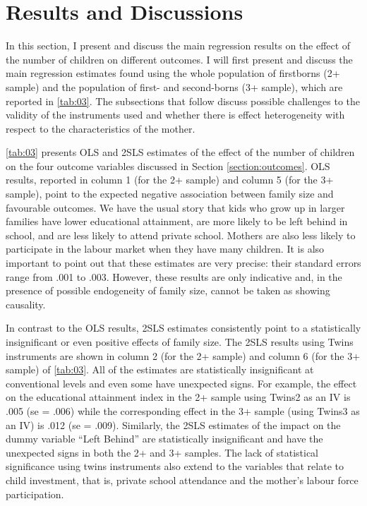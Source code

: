 
\section{Results and Discussions}
\label{section:results}

In this section, I present and discuss the main regression results on the effect of the number of children on different outcomes. I will first present and discuss the main regression estimates found using the whole population of firstborns (2+ sample) and the population of first- and second-borns (3+ sample), which are reported in \autoref{tab:03}. The subsections that follow discuss possible challenges to the validity of the instruments used and whether there is effect heterogeneity with respect to the characteristics of the mother.

\autoref{tab:03} presents OLS and 2SLS estimates of the effect of the number of children on the four outcome variables discussed in Section \ref{section:outcomes}. OLS results, reported in column 1 (for the 2+ sample) and column 5 (for the 3+ sample), point to the expected negative association between family size and favourable outcomes. We have the usual story that kids who grow up in larger families have lower educational attainment, are more likely to be left behind in school, and are less likely to attend private school. Mothers are also less likely to participate in the labour market when they have many children. It is also important to point out that these estimates are very precise: their standard errors range from .001 to .003. However, these results are only indicative and, in the presence of possible endogeneity of family size, cannot be taken as showing causality.

In contrast to the OLS results, 2SLS estimates consistently point to a statistically insignificant or even positive effects of family size. The 2SLS results using Twins instruments are shown in column 2 (for the 2+ sample) and column 6 (for the 3+ sample) of \autoref{tab:03}. All of the estimates are statistically insignificant at conventional levels and even some have unexpected signs. For example, the effect on the educational attainment index in the 2+ sample using Twins2 as an IV is .005 (se = .006) while the corresponding effect in the 3+ sample (using Twins3 as an IV) is .012 (se = .009). Similarly, the 2SLS estimates of the impact on the dummy variable \enquote{Left Behind} are statistically insignificant and have the unexpected signs in both the 2+ and 3+ samples. The lack of statistical significance using twins instruments also extend to the variables that relate to child investment, that is, private school attendance and the mother's labour force participation. 

